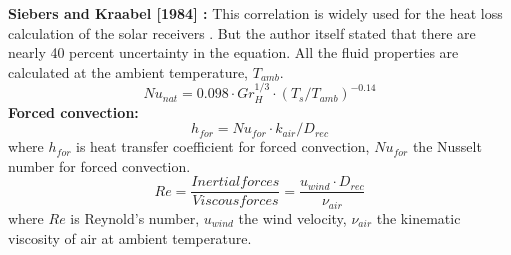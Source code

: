 \textbf{{Siebers and Kraabel [1984] \cite{Siebers.1984}:}}
This correlation is widely used for the heat loss calculation of the solar receivers \cite{Christian.2012}. But the author itself stated that there are nearly 40 percent uncertainty in the equation. All the fluid properties are calculated at the ambient temperature, $T_{amb}$.
\begin{equation}
Nu_{nat}=0.098\cdot Gr_H^{1/3}\cdot(T_s/T_{amb})^{-0.14}
\end{equation}
\textbf{{Forced convection:}}\\
\begin{equation}
h_{for}=Nu_{for}\cdot k_{air}/D_{rec}
\end{equation}
where $h_{for}$ is heat transfer coefficient for forced convection, $Nu_{for}$ the Nusselt number for forced convection.\\
\begin{equation}
Re= \frac{Inertial forces}{Viscous forces}=\frac{u_{wind}\cdot D_{rec}}{\nu_{air}}
\end{equation}
where $Re$ is Reynold's number, $u_{wind}$ the wind velocity, $\nu_{air}$ the  kinematic viscosity of air at ambient temperature.\\\\

